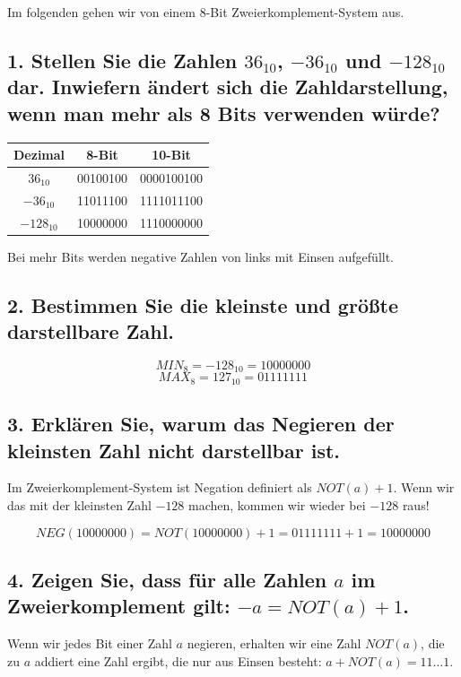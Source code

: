 \documentclass{article}
\begin{document}
Im folgenden gehen wir von einem 8-Bit Zweierkomplement-System aus.

\subsection*{1. Stellen Sie die Zahlen $36_{10}$, $-36_{10}$ und $-128_{10}$ dar. Inwiefern ändert sich die Zahldarstellung, wenn man mehr als 8 Bits verwenden würde?}

\begin{center}
\renewcommand{\arraystretch}{1.5}
\begin{tabular}{|c|c|c|}
\hline
Dezimal & 8-Bit & 10-Bit \\
\hline
$36_{10}$ & 00100100 & 0000100100 \\
$-36_{10}$ & 11011100 & 1111011100 \\
$-128_{10}$ & 10000000 & 1110000000 \\
\hline
\end{tabular}
\end{center}

Bei mehr Bits werden negative Zahlen von links mit Einsen aufgefüllt.

\subsection*{2. Bestimmen Sie die kleinste und größte darstellbare Zahl.}

$$
MIN_8 = -128_{10} = 10000000
$$
$$
MAX_8 = 127_{10} = 01111111
$$

\subsection*{3. Erklären Sie, warum das Negieren der kleinsten Zahl nicht darstellbar ist.}

Im Zweierkomplement-System ist Negation definiert als $NOT(a) + 1$. Wenn wir das mit der kleinsten Zahl $-128$ machen, kommen wir wieder bei $-128$ raus!

$$
NEG(10000000) = NOT(10000000) + 1 = 01111111 + 1 = 10000000
$$

\subsection*{4. Zeigen Sie, dass für alle Zahlen $a$ im Zweierkomplement gilt: $-a = NOT(a) + 1$.}

Wenn wir jedes Bit einer Zahl $a$ negieren, erhalten wir eine Zahl $NOT(a)$, die zu $a$ addiert eine Zahl ergibt, die nur aus Einsen besteht: $a + NOT(a) = 11\ldots1$.
\end{document}
